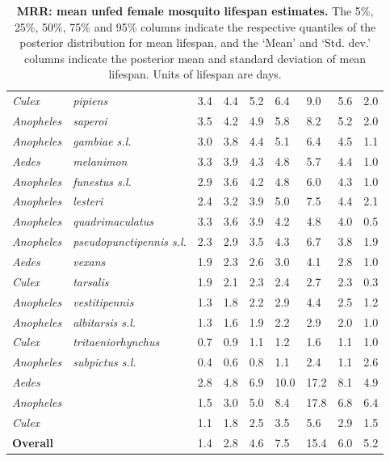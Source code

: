 \documentclass[12pt]{article}
\begin{document}
\begin{table}[htbp]
\begin{tabular}{l|l|l|l|l|l|l|l|l}
		\textit{Culex} & \textit{pipiens} & 3.4 & 4.4 & 5.2 & 6.4 & 9.0 & 5.6 & 2.0 \\
		\textit{Anopheles} & \textit{saperoi} & 3.5 & 4.2 & 4.9 & 5.8 & 8.2 & 5.2 & 2.0 \\
		\textit{Anopheles} & \textit{gambiae s.l.} & 3.0 & 3.8 & 4.4 & 5.1 & 6.4 & 4.5 & 1.1 \\
		\textit{Aedes} & \textit{melanimon} & 3.3 & 3.9 & 4.3 & 4.8 & 5.7 & 4.4 & 1.0 \\
		\textit{Anopheles} & \textit{funestus s.l.} & 2.9 & 3.6 & 4.2 & 4.8 & 6.0 & 4.3 & 1.0 \\
		\textit{Anopheles} & \textit{lesteri} & 2.4 & 3.2 & 3.9 & 5.0 & 7.5 & 4.4 & 2.1 \\
		\textit{Anopheles} & \textit{quadrimaculatus} & 3.3 & 3.6 & 3.9 & 4.2 & 4.8 & 4.0 & 0.5 \\
		\textit{Anopheles} & \textit{pseudopunctipennis s.l.} & 2.3 & 2.9 & 3.5 & 4.3 & 6.7 & 3.8 & 1.9 \\
		\textit{Aedes} & \textit{vexans} & 1.9 & 2.3 & 2.6 & 3.0 & 4.1 & 2.8 & 1.0 \\
		\textit{Culex} & \textit{tarsalis} & 1.9 & 2.1 & 2.3 & 2.4 & 2.7 & 2.3 & 0.3 \\
		\textit{Anopheles} & \textit{vestitipennis} & 1.3 & 1.8 & 2.2 & 2.9 & 4.4 & 2.5 & 1.2 \\
		\textit{Anopheles} & \textit{albitarsis s.l.} & 1.3 & 1.6 & 1.9 & 2.2 & 2.9 & 2.0 & 1.0 \\
		\textit{Culex} & \textit{tritaeniorhynchus} & 0.7 & 0.9 & 1.1 & 1.2 & 1.6 & 1.1 & 1.0 \\
		\textit{Anopheles} & \textit{subpictus s.l.} & 0.4 & 0.6 & 0.8 & 1.1 & 2.4 & 1.1 & 2.6 \\
		\hline
		\textit{Aedes} & \text{} & 2.8 & 4.8 & 6.9 & 10.0 & 17.2 & 8.1 & 4.9 \\
		\textit{Anopheles} & \text{} & 1.5 & 3.0 & 5.0 & 8.4 & 17.8 & 6.8 & 6.4 \\
		\textit{Culex} & \text{} & 1.1 & 1.8 & 2.5 & 3.5 & 5.6 & 2.9 & 1.5 \\
		\hline
		\textbf{Overall} & \text{} & 1.4 & 2.8 & 4.6 & 7.5 & 15.4 & 6.0 & 5.2 \\
	\end{tabular}
	\caption{\textbf{MRR: mean unfed female mosquito lifespan estimates.} The 5\%, 25\%, 50\%, 75\% and 95\% columns indicate the respective quantiles of the posterior distribution for mean lifespan, and the `Mean' and `Std. dev.' columns indicate the posterior mean and standard deviation of mean lifespan. Units of lifespan are days.}
	\label{tab:mrr_estimated_lifespans}%
\end{table}%
\end{document}
